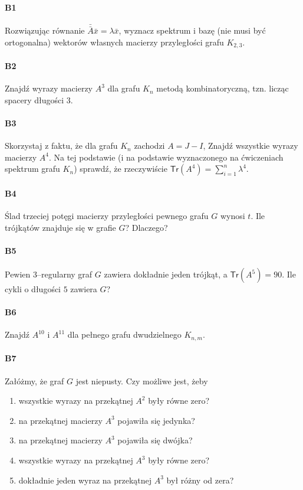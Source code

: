 \paragraph{B1} Rozwiązując równanie $\bar{\bar{A}}\bar{x} = \lambda \bar{x}$, wyznacz spektrum i bazę (nie musi być ortogonalna) wektorów własnych macierzy przyległości grafu $K_{2,3}$.

\paragraph{B2} Znajdź wyrazy macierzy $A^3$ dla grafu $K_n$ metodą kombinatoryczną, tzn. licząc spacery długości 3.

\paragraph{B3} Skorzystaj z faktu, że dla grafu $K_n$ zachodzi $A = J - I$, Znajdź wszystkie wyrazy macierzy $A^4$. Na tej podstawie (i na podstawie wyznaczonego na ćwiczeniach spektrum grafu $K_n$) sprawdź, że rzeczywiście $\mathsf{Tr}(A^4) = \sum ^n _{i=1}\lambda ^4$.

\paragraph{B4} Ślad trzeciej potęgi macierzy przyległości pewnego grafu $G$ wynosi $t$. Ile trójkątów znajduje się w grafie $G$? Dlaczego?

\paragraph{B5} Pewien 3–regularny graf $G$ zawiera dokładnie jeden trójkąt, a $\mathsf{Tr}(A^5) = 90$. Ile cykli o długości $5$ zawiera $G$?

\paragraph{B6} Znajdź $A^{10}$ i $A^{11}$ dla pełnego grafu dwudzielnego $K_{n,m}$.

\paragraph{B7} Załóżmy, że graf $G$ jest niepusty. Czy możliwe jest, żeby
\begin{enumerate}[label=\alph*)]
\item wszystkie wyrazy na przekątnej $A^2$ były równe zero?
\item na przekątnej macierzy $A^3$ pojawiła się jedynka?
\item na przekątnej macierzy $A^3$ pojawiła się dwójka?
\item wszystkie wyrazy na przekątnej $A^3$ były równe zero?
\item dokładnie jeden wyraz na przekątnej $A^3$ był różny od zera?
\end{enumerate}

